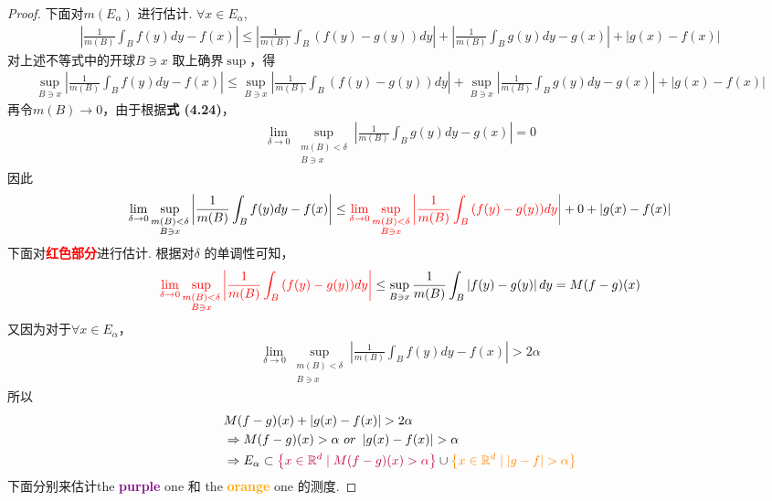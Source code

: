 \begin{thm}
\begin{proof}
			下面对$m(E_\alpha)$ 进行估计. $\forall x \in E_\alpha$,
			\begin{align}
				\left| \frac{1}{m(B)} \int_{B}{f(y) dy} - f(x) \right|
				\leq \left| \frac{1}{m(B)} \int_{B}{(f(y) - g(y)) dy} \right|
				+ \left| \frac{1}{m(B)} \int_{B}{g(y) dy} - g(x) \right|
				+ \left| g(x) - f(x) \right|
			\end{align}
			对上述不等式中的开球$B \ni x$ 取上确界$\sup$，得
			\begin{align}
				\sup_{B \ni x}{\left| \frac{1}{m(B)} \int_{B}{f(y) dy} - f(x) \right|}
				\leq \sup_{B \ni x}{\left| \frac{1}{m(B)} \int_{B}{(f(y) - g(y)) dy} \right|}
				+ \sup_{B \ni x}{\left| \frac{1}{m(B)} \int_{B}{g(y) dy} - g(x) \right|}
				+ \left| g(x) - f(x) \right|
			\end{align}
			再令$m(B) \to 0$，由于根据\textbf{式 (4.24)}，
			\begin{align}
				\lim_{\delta \to 0}{\sup_{\substack{m(B) < \delta \\ B \ni x}}{\left| \frac{1}{m(B)} \int_{B}{g(y) dy} - g(x) \right|}} = 0
			\end{align}
			因此
			\begin{align}
				\lim_{\delta \to 0}{\sup_{\substack{m(B) < \delta \\ B \ni x}}{\left| \frac{1}{m(B)} \int_{B}{f(y) dy} - f(x) \right|}}
				\leq \textcolor{red}{\lim_{\delta \to 0}{\sup_{\substack{m(B) < \delta \\ B \ni x}}{\left| \frac{1}{m(B)} \int_{B}{(f(y) - g(y)) dy} \right|}}}
				+ 0
				+ \left| g(x) - f(x) \right|
			\end{align}
			下面对\textcolor{red}{\textbf{红色部分}}进行估计. 根据对$\delta$ 的单调性可知，
			\begin{align}
				\textcolor{red}{\lim_{\delta \to 0}{\sup_{\substack{m(B) < \delta \\ B \ni x}}{\left| \frac{1}{m(B)} \int_{B}{(f(y) - g(y)) dy} \right|}}}
				\leq \sup_{B \ni x}{\frac{1}{m(B)} \int_{B}{\left| f(y) - g(y) \right| dy}}
				= M(f - g)(x)
			\end{align}
			又因为对于$\forall x \in E_\alpha$，
			\begin{align}
				\lim_{\delta \to 0}{\sup_{\substack{m(B) < \delta \\ B \ni x}}{\left| \frac{1}{m(B)} \int_{B}{f(y) dy} - f(x) \right|}}
				> 2 \alpha
			\end{align}
			所以
			\begin{align}
				&M(f - g)(x) + \left| g(x) - f(x) \right| > 2\alpha \\
				&\Rightarrow M(f - g)(x) > \alpha \,\, or \,\, \left| g(x) - f(x) \right| > \alpha \\
				&\Rightarrow E_\alpha 
				\subset \textcolor{purple}{\left\{ x \in \mathbb{R}^d \mid M(f - g)(x) > \alpha \right\}}
				\cup \textcolor{orange}{\left\{ x \in \mathbb{R}^d \mid \left| g - f \right| > \alpha \right\}}
			\end{align}
			下面分别来估计the \textcolor{purple}{\textbf{purple}} one 和 the \textcolor{orange}{\textbf{orange}} one 的测度.
			

\end{proof}
\end{thm}
